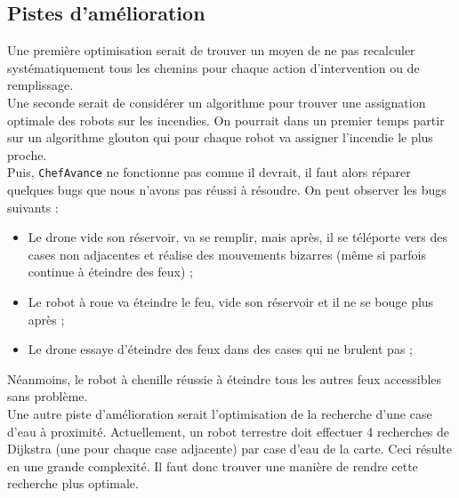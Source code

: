 \documentclass[a4paper,10pt]{article} %
\begin{document}
\subsection{Pistes d'amélioration}
Une première optimisation serait de trouver un moyen de ne pas recalculer systématiquement tous les chemins pour chaque action d'intervention ou de remplissage.\\

Une seconde serait de considérer un algorithme pour trouver une assignation optimale des robots sur les incendies. On pourrait dans un premier temps partir sur un algorithme glouton qui pour chaque robot va assigner l'incendie le plus proche.\\

Puis, \texttt{ChefAvance} ne fonctionne pas comme il devrait, il faut alors réparer quelques bugs que nous n'avons pas réussi à résoudre. On peut observer les bugs suivants :

\begin{itemize}
    \item Le drone vide son réservoir, va se remplir, mais après, il se téléporte vers des cases non adjacentes et réalise des mouvements bizarres (même si parfois continue à éteindre des feux) ;
    \item Le robot à roue va éteindre le feu, vide son réservoir et il ne se bouge plus après ;
    \item Le drone essaye d'éteindre des feux dans des cases qui ne brulent pas ;
\end{itemize}

Néanmoins, le robot à chenille réussie à éteindre tous les autres feux accessibles sans problème.\\

Une autre piste d'amélioration serait l'optimisation de la recherche d'une case d'eau à proximité. Actuellement, un robot terrestre doit effectuer 4 recherches de Dijkstra (une pour chaque case adjacente) par case d'eau de la carte. Ceci résulte en une grande complexité. Il faut donc trouver une manière de rendre cette recherche plus optimale. \\
\end{document}
